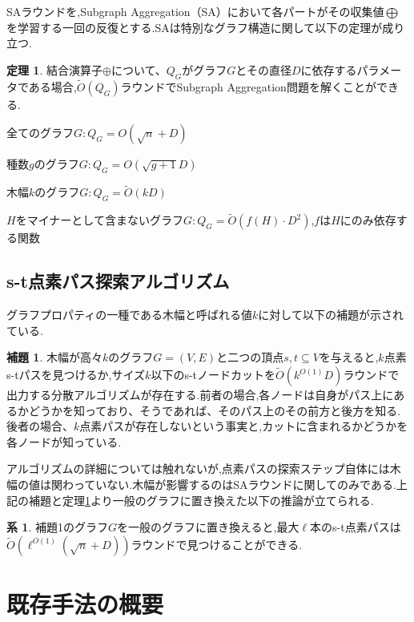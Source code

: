 \documentclass{thesis}
\theoremstyle{definition}
\newtheorem{theorem}{定理}
\newtheorem{lemma}{補題}
\newtheorem{corollary}{系}
\begin{document}
SAラウンドを,Subgraph Aggregation（SA）において各パートがその収集値$\bigoplus$を学習する一回の反復とする.SAは特別なグラフ構造に関して以下の定理が成り立つ.

\begin{theorem} \label{theorem:1}
    結合演算子$\oplus$について、$Q_G$がグラフ$G$とその直径$D$に依存するパラメータである場合,$\tilde{O}(Q_G)$ラウンドでSubgraph Aggregation問題を解くことができる.
    \item 全てのグラフ$G:Q_G = O(\sqrt{n}+D)$
    \item 種数$g$のグラフ$G:Q_G=O(\sqrt{g+1}D)$
    \item 木幅$k$のグラフ$G:Q_G=\tilde{O}(kD)$
    \item $H$をマイナーとして含まないグラフ$G:Q_G=\tilde{O}(f(H)\cdot D^2)$,$f$は$H$にのみ依存する関数
\end{theorem}

\section{s-t点素パス探索アルゴリズム}
グラフプロパティの一種である木幅と呼ばれる値$k$に対して以下の補題が示されている.

\begin{lemma}
    木幅が高々$k$のグラフ$G=(V,E)$と二つの頂点$s,t\subseteq V$を与えると,$k$点素s-tパスを見つけるか,サイズ$k$以下のs-tノードカットを$\tilde{O}(k^{O(1)}D)$ラウンドで出力する分散アルゴリズムが存在する.前者の場合,各ノードは自身がパス上にあるかどうかを知っており、そうであれば、そのパス上のその前方と後方を知る.後者の場合、$k$点素パスが存在しないという事実と,カットに含まれるかどうかを各ノードが知っている.
\end{lemma}

 アルゴリズムの詳細については触れないが,点素パスの探索ステップ自体には木幅の値は関わっていない.木幅が影響するのはSAラウンドに関してのみである.上記の補題と定理\ref{theorem:1}より一般のグラフに置き換えた以下の推論が立てられる.

\begin{corollary}
    補題1のグラフ$G$を一般のグラフに置き換えると,最大$\ell$本のs-t点素パスは$\tilde{O}(\ell^{O(1)}(\sqrt{n}+D))$ラウンドで見つけることができる.
\end{corollary}

\section{}

\chapter{既存手法の概要}
\end{document}
